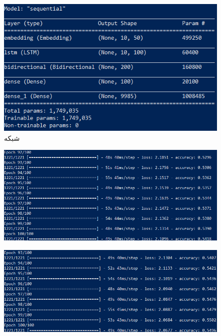 \documentclass[10pt]{article}
\begin{document}
		\begin{figure}[ht!]
		\centering\includegraphics[width=\linewidth]{../reports/lm_model.png}
		\caption{شبکه 
			}
		\label{lm}
	\end{figure}
	
	
	\begin{figure}[ht!]
		\centering\includegraphics[width=\linewidth]{../reports/lm_dep.png}
		\caption{ 
			}
		\label{lm_dep}
	\end{figure}

	\begin{figure}[ht!]
		\centering\includegraphics[width=\linewidth]{../reports/lm_hap.png}
		\caption{
			}
		\label{lm_hap}
	\end{figure}
\end{document}
